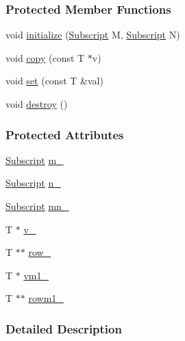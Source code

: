 \subsubsection*{Protected Member Functions}
\begin{DoxyCompactItemize}
\item 
void \hyperlink{class_t_n_t_1_1_matrix_abc963d455626c3f0a170b2df8d40c39a}{initialize} (\hyperlink{namespace_t_n_t_af22e3f1460e145c04ce4e7d701e4c1c1}{Subscript} M, \hyperlink{namespace_t_n_t_af22e3f1460e145c04ce4e7d701e4c1c1}{Subscript} N)
\item 
void \hyperlink{class_t_n_t_1_1_matrix_ab14f23495e591b50b73574e154a178a7}{copy} (const T $\ast$v)
\item 
void \hyperlink{class_t_n_t_1_1_matrix_a9bafeab51d069cf4bf310540e0a05df6}{set} (const T \&val)
\item 
void \hyperlink{class_t_n_t_1_1_matrix_a44f6121414c93eb548b0bd82a03e7ecc}{destroy} ()
\end{DoxyCompactItemize}
\subsubsection*{Protected Attributes}
\begin{DoxyCompactItemize}
\item 
\hyperlink{namespace_t_n_t_af22e3f1460e145c04ce4e7d701e4c1c1}{Subscript} \hyperlink{class_t_n_t_1_1_matrix_a72e92c4629de6a79ac12a1039f461b6f}{m\_\-}
\item 
\hyperlink{namespace_t_n_t_af22e3f1460e145c04ce4e7d701e4c1c1}{Subscript} \hyperlink{class_t_n_t_1_1_matrix_ab7dc73d05542cc97be2280a50ac1374c}{n\_\-}
\item 
\hyperlink{namespace_t_n_t_af22e3f1460e145c04ce4e7d701e4c1c1}{Subscript} \hyperlink{class_t_n_t_1_1_matrix_a1211bb821e4b22be124e16b1123f769c}{mn\_\-}
\item 
T $\ast$ \hyperlink{class_t_n_t_1_1_matrix_a6a7ca17d4336b010fbde3036bbe54093}{v\_\-}
\item 
T $\ast$$\ast$ \hyperlink{class_t_n_t_1_1_matrix_a9b970ee02290aa814d67ca6e8a4ebc60}{row\_\-}
\item 
T $\ast$ \hyperlink{class_t_n_t_1_1_matrix_a7bee192ea8a850399382ff79c9d176bf}{vm1\_\-}
\item 
T $\ast$$\ast$ \hyperlink{class_t_n_t_1_1_matrix_a099ebf68bd8eb98cda5844ca99dbf614}{rowm1\_\-}
\end{DoxyCompactItemize}


\subsubsection{Detailed Description}
